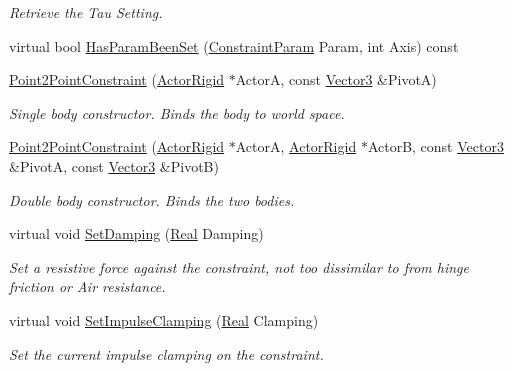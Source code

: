 \begin{DoxyCompactItemize}
\begin{DoxyCompactList}\small\item\em Retrieve the Tau Setting. \item\end{DoxyCompactList}\item 
virtual bool \hyperlink{classMezzanine_1_1Point2PointConstraint_a658027a5d0f5774a92a279485ccfe29d}{HasParamBeenSet} (\hyperlink{namespaceMezzanine_a6c62e8c2938fb203eb7a7072c12176f4}{ConstraintParam} Param, int Axis) const 
\item 
\hyperlink{classMezzanine_1_1Point2PointConstraint_a62ddd5588e4b7c95892eca8486cea099}{Point2PointConstraint} (\hyperlink{classMezzanine_1_1ActorRigid}{ActorRigid} $\ast$ActorA, const \hyperlink{classMezzanine_1_1Vector3}{Vector3} \&PivotA)
\begin{DoxyCompactList}\small\item\em Single body constructor. Binds the body to world space. \item\end{DoxyCompactList}\item 
\hyperlink{classMezzanine_1_1Point2PointConstraint_a216daa575bd4dc2589875ca24a97faa8}{Point2PointConstraint} (\hyperlink{classMezzanine_1_1ActorRigid}{ActorRigid} $\ast$ActorA, \hyperlink{classMezzanine_1_1ActorRigid}{ActorRigid} $\ast$ActorB, const \hyperlink{classMezzanine_1_1Vector3}{Vector3} \&PivotA, const \hyperlink{classMezzanine_1_1Vector3}{Vector3} \&PivotB)
\begin{DoxyCompactList}\small\item\em Double body constructor. Binds the two bodies. \item\end{DoxyCompactList}\item 
virtual void \hyperlink{classMezzanine_1_1Point2PointConstraint_a85187ada76b4637851bd80cafcb3d704}{SetDamping} (\hyperlink{namespaceMezzanine_a726731b1a7df72bf3583e4a97282c6f6}{Real} Damping)
\begin{DoxyCompactList}\small\item\em Set a resistive force against the constraint, not too dissimilar to from hinge friction or Air resistance. \item\end{DoxyCompactList}\item 
virtual void \hyperlink{classMezzanine_1_1Point2PointConstraint_a609bf21f94cd31189f222350d4b0049e}{SetImpulseClamping} (\hyperlink{namespaceMezzanine_a726731b1a7df72bf3583e4a97282c6f6}{Real} Clamping)
\begin{DoxyCompactList}\small\item\em Set the current impulse clamping on the constraint. \item\end{DoxyCompactList}\item 

\end{DoxyCompactItemize}
